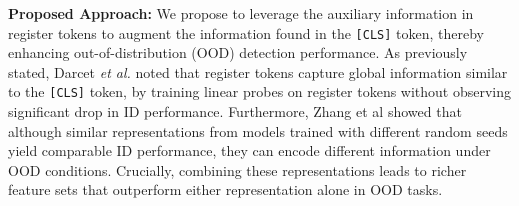 \documentclass[conference]{IEEEtran}
\begin{document}
\noindent\textbf{Proposed Approach:}
We propose to leverage the auxiliary information in register tokens to augment the information found in the \texttt{[CLS]} token, thereby enhancing out-of-distribution (OOD) detection performance. As previously stated, Darcet \textit{et al.} \cite{darcet2024vision} noted that register tokens capture global information similar to the \texttt{[CLS]} token, by training linear probes on register tokens without observing significant drop in ID performance. Furthermore, Zhang et al \cite{zhang2023learning} showed that although similar representations from models trained with different random seeds yield comparable ID performance, they can encode different information under OOD conditions. Crucially, combining these representations leads to richer feature sets that outperform either representation alone in OOD tasks.
\end{document}
